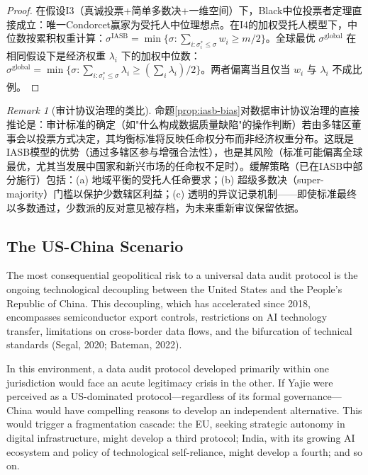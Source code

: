 \documentclass[12pt,a4paper]{ctexart}
\theoremstyle{definition}
\theoremstyle{remark}
\newtheorem{remark}{Remark}[section]
\begin{document}
\begin{proof}
在假设I3（真诚投票+简单多数决+一维空间）下，Black中位投票者定理直接成立：唯一Condorcet赢家为受托人中位理想点。在I4的加权受托人模型下，中位数按累积权重计算：$\sigma^{\text{IASB}} = \min\{\sigma : \sum_{i: \sigma_i^* \leq \sigma} w_i \geq m/2\}$。全球最优 $\sigma^{\text{global}}$ 在相同假设下是经济权重 $\lambda_i$ 下的加权中位数：$\sigma^{\text{global}} = \min\{\sigma : \sum_{i: \sigma_i^* \leq \sigma} \lambda_i \geq (\sum_i \lambda_i)/2\}$。两者偏离当且仅当 $w_i$ 与 $\lambda_i$ 不成比例。
\end{proof}

\begin{remark}[审计协议治理的类比]
命题\ref{prop:iasb-bias}对数据审计协议治理的直接推论是：审计标准的确定（如"什么构成数据质量缺陷"的操作判断）若由多辖区董事会以投票方式决定，其均衡标准将反映任命权分布而非经济权重分布。这既是IASB模型的优势（通过多辖区参与增强合法性），也是其风险（标准可能偏离全球最优，尤其当发展中国家和新兴市场的任命权不足时）。缓解策略（已在IASB中部分施行）包括：(a) 地域平衡的受托人任命要求；(b) 超级多数决（super-majority）门槛以保护少数辖区利益；(c) 透明的异议记录机制——即使标准最终以多数通过，少数派的反对意见被存档，为未来重新审议保留依据。
\end{remark}

\subsection{The US-China Scenario}

The most consequential geopolitical risk to a universal data audit protocol is the ongoing technological decoupling between the United States and the People's Republic of China. This decoupling, which has accelerated since 2018, encompasses semiconductor export controls, restrictions on AI technology transfer, limitations on cross-border data flows, and the bifurcation of technical standards (Segal, 2020; Bateman, 2022).

In this environment, a data audit protocol developed primarily within one jurisdiction would face an acute legitimacy crisis in the other. If Yajie were perceived as a US-dominated protocol—regardless of its formal governance—China would have compelling reasons to develop an independent alternative. This would trigger a fragmentation cascade: the EU, seeking strategic autonomy in digital infrastructure, might develop a third protocol; India, with its growing AI ecosystem and policy of technological self-reliance, might develop a fourth; and so on.
\end{document}
